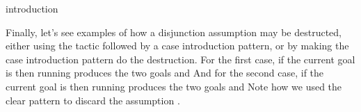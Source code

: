 \begin{tactic}[$\tau$=>$\;\iota_1 \cdots \iota_n$]{introduction}
\begin{tsyntax}[empty]{}
    Finally, let's see examples of how a disjunction assumption
    may be destructed, either using the  tactic followed
    by a case introduction pattern, or by making the
    case introduction pattern do the destruction.
    For the first case, if the current goal is
    then running
    produces the two goals
    and
    And for the second case, if the current goal is
    then running
    produces the two goals
    and
    Note how we used the clear pattern to discard the assumption
    .
  \end{tsyntax}
\end{tactic}

